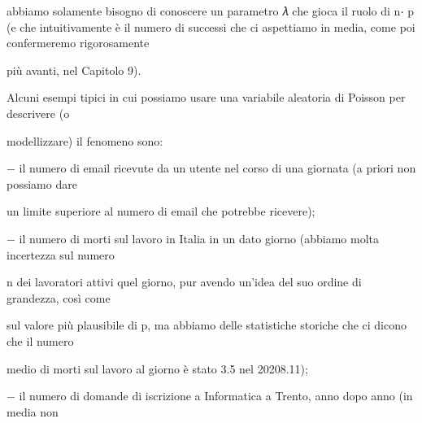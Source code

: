 \documentclass[a4paper,portrait,12pt]{article}
\begin{document}
\begin{flushleft}
abbiamo solamente bisogno di conoscere un parametro 𝜆 che gioca il ruolo di n⋅ p (e che intuitivamente \`{e} il numero di successi che ci aspettiamo in media, come poi confermeremo rigorosamente
\end{flushleft}


\begin{flushleft}
più avanti, nel Capitolo 9).
\end{flushleft}


\begin{flushleft}
Alcuni esempi tipici in cui possiamo usare una variabile aleatoria di Poisson per descrivere (o
\end{flushleft}


\begin{flushleft}
modellizzare) il fenomeno sono:
\end{flushleft}


\begin{flushleft}
$-$ il numero di email ricevute da un utente nel corso di una giornata (a priori non possiamo dare
\end{flushleft}


\begin{flushleft}
un limite superiore al numero di email che potrebbe ricevere);
\end{flushleft}


\begin{flushleft}
$-$ il numero di morti sul lavoro in Italia in un dato giorno (abbiamo molta incertezza sul numero
\end{flushleft}


\begin{flushleft}
n dei lavoratori attivi quel giorno, pur avendo un'idea del suo ordine di grandezza, così come
\end{flushleft}


\begin{flushleft}
sul valore più plausibile di p, ma abbiamo delle statistiche storiche che ci dicono che il numero
\end{flushleft}


\begin{flushleft}
medio di morti sul lavoro al giorno \`{e} stato 3.5 nel 20208.11);
\end{flushleft}


\begin{flushleft}
$-$ il numero di domande di iscrizione a Informatica a Trento, anno dopo anno (in media non
\end{flushleft}
\end{document}
